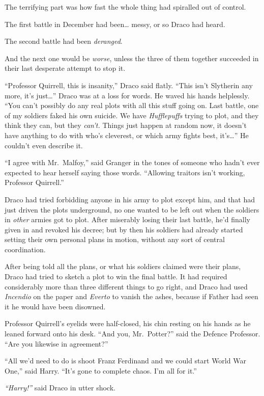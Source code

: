 The terrifying part was how fast the whole thing had spiralled out of
control.

The first battle in December had been\ldots{} messy, or so Draco had
heard.

The second battle had been \emph{deranged}.

And the next one would be \emph{worse}, unless the three of them
together succeeded in their last desperate attempt to stop it.

``Professor Quirrell, this is insanity,'' Draco said flatly. ``This
isn't Slytherin any more, it's just\ldots{}'' Draco was at a loss for
words. He waved his hands helplessly. ``You can't possibly do any real
plots with all this stuff going on. Last battle, one of my soldiers
faked his own suicide. We have \emph{Hufflepuffs} trying to plot, and
they think they can, but they \emph{can't.} Things just happen at random
now, it doesn't have anything to do with who's cleverest, or which army
fights best, it's\ldots{}'' He couldn't even describe it.

``I agree with Mr.~Malfoy,'' said Granger in the tones of someone who
hadn't ever expected to hear herself saying those words. ``Allowing
traitors isn't working, Professor Quirrell.''

Draco had tried forbidding anyone in his army to plot except him, and
that had just driven the plots underground, no one wanted to be left out
when the soldiers in \emph{other} armies got to plot. After miserably
losing their last battle, he'd finally given in and revoked his decree;
but by then his soldiers had already started setting their own personal
plans in motion, without any sort of central coordination.

After being told all the plans, or what his soldiers claimed were their
plans, Draco had tried to sketch a plot to win the final battle. It had
required considerably more than three different things to go right, and
Draco had used \emph{Incendio} on the paper and \emph{Everto} to vanish
the ashes, because if Father had seen it he would have been disowned.

Professor Quirrell's eyelids were half-closed, his chin resting on his
hands as he leaned forward onto his desk. ``And you, Mr.~Potter?'' said
the Defence Professor. ``Are you likewise in agreement?''

``All we'd need to do is shoot Franz Ferdinand and we could start World
War One,'' said Harry. ``It's gone to complete chaos. I'm all for it.''

\emph{``Harry!''} said Draco in utter shock.

